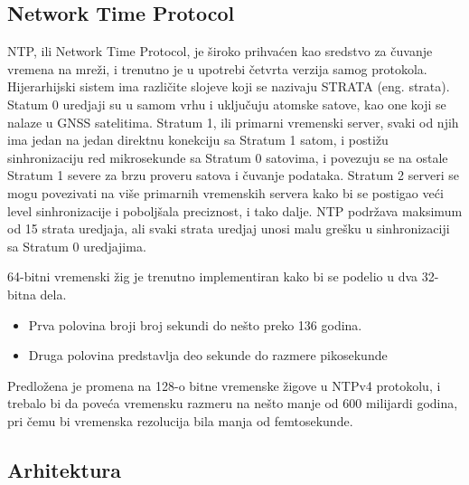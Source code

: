 \documentclass[a4paper,12pt, master]{etf}
\begin{document}
	\subsection{Network Time Protocol}

	NTP, ili Network Time Protocol, je \v{s}iroko prihva\'{c}en kao sredstvo za
	\v{c}uvanje vremena na mre\v{z}i, i trenutno je u upotrebi \v{c}etvrta
	verzija samog protokola. Hijerarhijski sistem ima razli\v{c}ite slojeve
	koji se nazivaju STRATA (eng\@. strata). Statum 0 uredjaji su u samom vrhu i
	uklju\v{c}uju atomske satove, kao one koji se nalaze u GNSS	satelitima.
	Stratum 1, ili primarni vremenski server, svaki od njih ima jedan na jedan
	direktnu konekciju sa Stratum 1 satom, i posti\v{z}u sinhronizaciju red
	mikrosekunde sa Stratum	0 satovima, i povezuju se na ostale Stratum 1
	severe za brzu proveru satova i \v{c}uvanje	podataka. Stratum 2 serveri se
	mogu povezivati na vi\v{s}e primarnih vremenskih servera kako bi se
	postigao ve\'{c}i level sinhronizacije i pobolj\v{s}ala preciznost, i tako
	dalje. NTP podr\v{z}ava maksimum od 15 strata uredjaja, ali svaki strata
	uredjaj unosi malu gre\v{s}ku u	sinhronizaciji sa Stratum 0 uredjajima.

	64-bitni vremenski \v{z}ig je trenutno implementiran kako bi se podelio u
	dva 32-bitna dela.
	\begin{itemize}
		\item Prva polovina broji broj sekundi do ne\v{s}to preko 136 godina.
		\item Druga polovina predstavlja deo sekunde do razmere pikosekunde
	\end{itemize}

	Predlo\v{z}ena je promena na 128-o bitne vremenske \v{z}igove u NTPv4
	protokolu, i trebalo bi da pove\'{c}a vremensku razmeru na ne\v{s}to manje
	od 600 milijardi godina, pri \v{c}emu bi vremenska rezolucija bila manja od
	femtosekunde.

    \subsection{Arhitektura}
\end{document}
